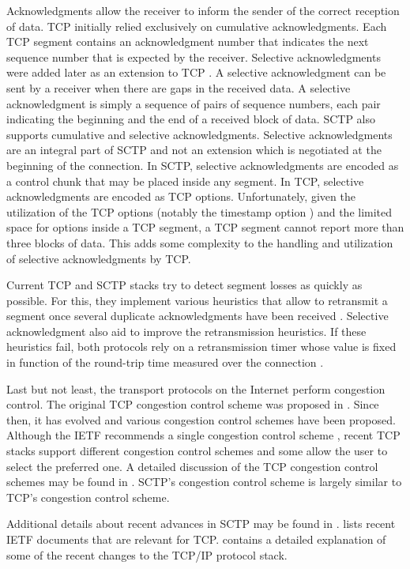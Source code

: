 Acknowledgments allow the receiver to inform the sender of the correct reception of data. TCP initially relied exclusively on cumulative acknowledgments. Each TCP segment contains an acknowledgment number that indicates the next sequence number that is expected by the receiver. Selective acknowledgments were added later as an extension to TCP \cite{rfc2018}. A selective acknowledgment can be sent by a receiver when there are gaps in the received data. A selective acknowledgment is simply a sequence of pairs of sequence numbers, each pair indicating the beginning and the end of a received block of data. SCTP also supports cumulative and selective acknowledgments. Selective acknowledgments are an integral part of SCTP and not an extension which is negotiated at the beginning of the connection. In SCTP, selective acknowledgments are encoded as a control chunk that may be placed inside any segment. In TCP, selective acknowledgments are encoded as TCP options. Unfortunately, given the utilization of the TCP options (notably the timestamp option \cite{rfc1323}) and the limited space for options inside a TCP segment, a TCP segment cannot report more than three blocks of data. This adds some complexity to the handling and utilization of selective acknowledgments by TCP.

Current TCP and SCTP stacks try to detect segment losses as quickly as possible. For this, they implement various heuristics that allow to retransmit a segment once several duplicate acknowledgments have been received \cite{Fall_TCP:2011}. Selective acknowledgment also aid to improve the retransmission heuristics. If these heuristics fail, both protocols rely on a retransmission timer whose value is fixed in function of the round-trip time measured over the connection \cite{rfc6298}.

Last but not least, the transport protocols on the Internet perform congestion control. The original TCP congestion control scheme was proposed in \cite{Jacobson_congestion:88}. Since then, it has evolved and various congestion control schemes have been proposed. Although the IETF recommends a single congestion control scheme \cite{rfc5681}, recent TCP stacks support different congestion control schemes and some allow the user to select the preferred one. A detailed discussion of the TCP congestion control schemes may be found in \cite{Afanasyev_Congestion:2012}. SCTP's congestion control scheme is largely similar to TCP's congestion control scheme. 

Additional details about recent advances in SCTP may be found in \cite{Budzisz_Taxonomy:2012}. \cite{rfc4614} lists recent IETF documents that are relevant for TCP. \cite{Fall_TCP:2011} contains a detailed explanation of some of the recent changes to the TCP/IP protocol stack.


